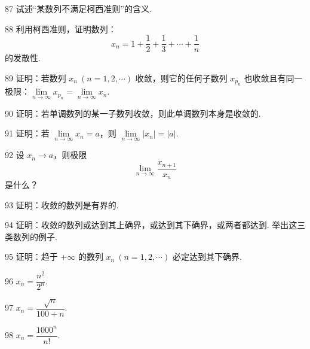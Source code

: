 \begin{prob}[S]{87}
试述“某数列不满足柯西准则”的含义.
\end{prob}

\begin{prob}[M]{88}
利用柯西准则，证明数列：
\[
x_n = 1 + \frac{1}{2} + \frac{1}{3} + \cdots + \frac{1}{n}
\]
的发散性.
\end{prob}

\begin{prob}[M]{89}
证明：若数列 $x_n\ (n=1,2,\cdots)$ 收敛，则它的任何子数列 $x_{p_n}$ 也收敛且有同一极限：$\lim\limits_{n\to\infty} x_{p_n} = \lim\limits_{n\to\infty} x_n$.
\end{prob}

\begin{prob}[M]{90}
证明：若单调数列的某一子数列收敛，则此单调数列本身是收敛的.
\end{prob}

\begin{prob}[M]{91}
证明：若 $\lim\limits_{n\to\infty} x_n = a$，则 $\lim\limits_{n\to\infty} |x_n| = |a|$.
\end{prob}

\begin{prob}[S]{92}
设 $x_n \to a$，则极限
\[
\lim_{n\to\infty} \frac{x_{n+1}}{x_n}
\]
是什么？
\end{prob}

\begin{prob}[M]{93}
证明：收敛的数列是有界的.
\end{prob}

\begin{prob}[M]{94}
证明：收敛的数列或达到其上确界，或达到其下确界，或两者都达到. 举出这三类数列的例子.
\end{prob}

\begin{prob}[M]{95}
证明：趋于 $+\infty$ 的数列 $x_n\ (n=1,2,\cdots)$ 必定达到其下确界.
\end{prob}


\begin{prob}[S]{96}
$x_n = \dfrac{n^2}{2^n}$.
\end{prob}

\begin{prob}[S]{97}
$x_n = \dfrac{\sqrt{n}}{100+n}$.
\end{prob}

\begin{prob}[S]{98}
$x_n = \dfrac{1000^n}{n!}$.
\end{prob}

